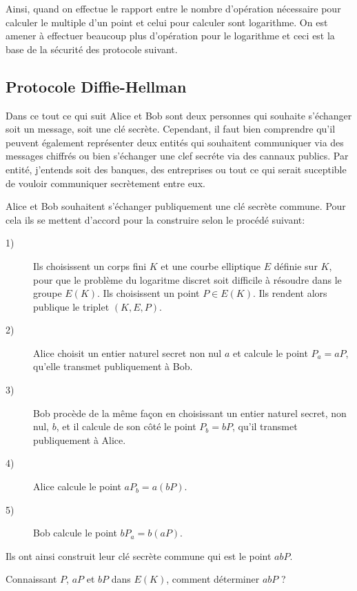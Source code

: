 Ainsi, quand on effectue le rapport entre le nombre d'opération nécessaire pour calculer le
multiple d'un point et celui pour calculer sont logarithme. On est amener à effectuer beaucoup
plus d'opération pour le logarithme et ceci est la base de la sécurité des protocole suivant.


\subsection{Protocole Diffie-Hellman}

Dans ce tout ce qui suit Alice et Bob sont deux personnes qui souhaite s'échanger soit un message, soit
une clé secrète. Cependant, il faut bien comprendre qu'il peuvent également représenter deux
entités qui souhaitent communiquer via des messages chiffrés ou bien s'échanger une clef
secréte via des cannaux publics. Par entité, j'entends soit des banques, des entreprises ou
tout ce qui serait suceptible de vouloir communiquer secrètement entre eux.

Alice et Bob souhaitent s'échanger publiquement une clé secrète commune. Pour cela ils se mettent d'accord pour la construire selon le procédé suivant:

\begin{description}
    \item[1)] Ils choisissent un corps fini $K$ et une courbe elliptique $E$ définie sur $K$, pour que le problème du logaritme discret soit difficile à résoudre dans le groupe $E(K)$. Ils choisissent un point $P \in E(K)$. Ils rendent alors publique le triplet $(K,E,P)$.

    \item[2)] Alice choisit un entier naturel secret non nul $a$ et calcule le point $P_a=aP$, qu'elle transmet publiquement à Bob.

    \item[3)] Bob procède de la même façon en choisissant un entier naturel secret, non nul,
        $b$, et il calcule de son côté le point $P_b=bP$, qu'il transmet publiquement à Alice.

    \item[4)] Alice calcule le point $aP_b=a(bP)$.

    \item[5)] Bob calcule le point $bP_a=b(aP)$.
\end{description}

Ils ont ainsi construit leur clé secrète commune qui est le point $abP$.

\begin{probleme}
   Connaissant $P$, $aP$ et $bP$ dans $E(K)$, comment déterminer $abP$ ? 
\end{probleme}

